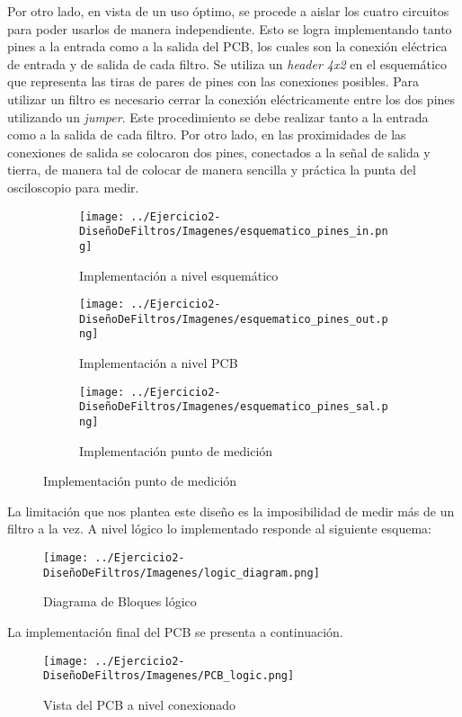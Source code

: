 Por otro lado, en vista de un uso óptimo, se procede a aislar los cuatro circuitos para poder usarlos de manera independiente. Esto se logra implementando 
tanto pines a la entrada como a la salida del PCB, los cuales son la conexión eléctrica de entrada y de salida de cada filtro. Se utiliza un 
\textit{header 4x2} en el esquemático que representa las tiras de pares de pines con las conexiones posibles. Para utilizar un filtro es necesario cerrar
 la conexión eléctricamente entre los dos pines utilizando un \textit{jumper}. Este procedimiento se debe realizar tanto a la entrada como a la salida de 
 cada filtro.  Por otro lado, en las proximidades de las conexiones de salida se colocaron dos pines, conectados a la señal de salida y tierra,
  de manera tal de colocar de manera sencilla y práctica la punta del osciloscopio para medir.

\begin{figure}
      
 \centering
 \begin{subfigure}[b]{0.25\textwidth}
     \centering
     \texttt{[image: ../Ejercicio2-DiseñoDeFiltros/Imagenes/esquematico\_pines\_in.png]}
     \caption{Implementación a nivel esquemático}
 \end{subfigure}
 \hfill
 \begin{subfigure}[b]{0.25\textwidth}
     \centering
     \texttt{[image: ../Ejercicio2-DiseñoDeFiltros/Imagenes/esquematico\_pines\_out.png]}
     \caption{Implementación a nivel PCB}
 \end{subfigure}
 \hfill
 \begin{subfigure}[b]{0.25\textwidth}
    \centering
    \texttt{[image: ../Ejercicio2-DiseñoDeFiltros/Imagenes/esquematico\_pines\_sal.png]}
    \caption{Implementación punto de medición}
\end{subfigure}
\end{figure}

La limitación que nos plantea este diseño es la imposibilidad de medir más de un filtro a la vez. A nivel lógico lo implementado responde al siguiente 
esquema:

\begin{figure}[H]
    \centering
    \texttt{[image: ../Ejercicio2-DiseñoDeFiltros/Imagenes/logic\_diagram.png]}
    \caption{Diagrama de Bloques lógico}
\end{figure}

La implementación final del PCB se presenta a continuación.
\begin{figure}[H]
    \centering
    \texttt{[image: ../Ejercicio2-DiseñoDeFiltros/Imagenes/PCB\_logic.png]}
    \caption{Vista del PCB a nivel conexionado}
\end{figure}

